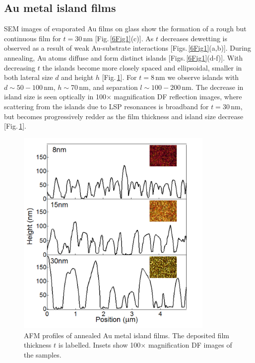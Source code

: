 \subsection{Au metal island films}

SEM images of evaporated Au films on glass show the formation of a rough but continuous film for $t=30$\,nm [Fig.\,\ref{6Fig1}(c)]. As $t$ decreases dewetting is observed as a result of weak Au-substrate interactions [Figs.\,\ref{6Fig1}(a,b)]. During annealing, Au atoms diffuse and form distinct islands [Figs.\,\ref{6Fig1}(d-f)]. With decreasing $t$ the islands become more closely spaced and ellipsoidal, smaller in both lateral size $d$ and height $h$ [Fig.\,\ref{6Fig2}]. For $t=8$\,nm we observe islands with $d \sim 50-100$\,nm, $h\sim$70\,nm, and separation $l \sim 100-200$\,nm. The decrease in island size is seen optically in 100$\times$ magnification DF reflection images, where scattering from the islands due to LSP resonances is broadband for $t=30$\,nm, but becomes progressively redder as the film thickness and island size decrease [Fig.\,\ref{6Fig2}]. 
\begin{figure}[h!] 
\centering    
\includegraphics[width=0.85\textwidth]{Fig2}
\caption{AFM profiles of annealed Au metal island films. The deposited film thickness $t$ is labelled. Insets show 100$\times$ magnification DF images of the samples.}
\label{6Fig2}
\end{figure}

